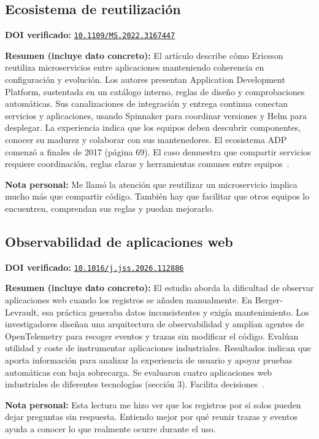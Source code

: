 \documentclass[12pt,a4paper]{article}
\begin{document}
\subsection{Ecosistema de reutilización}
\noindent\textbf{DOI verificado:} \href{https://doi.org/10.1109/MS.2022.3167447}{\nolinkurl{10.1109/MS.2022.3167447}}\par
\noindent\textbf{Resumen (incluye dato concreto):} El artículo describe cómo Ericsson reutiliza microservicios entre aplicaciones manteniendo coherencia en configuración y evolución. Los autores presentan Application Development Platform, sustentada en un catálogo interno, reglas de diseño y comprobaciones automáticas. Sus canalizaciones de integración y entrega continua conectan servicios y aplicaciones, usando Spinnaker para coordinar versiones y Helm para desplegar. La experiencia indica que los equipos deben descubrir componentes, conocer su madurez y colaborar con sus mantenedores. El ecosistema ADP comenzó a finales de 2017 (página 69). El caso demuestra que compartir servicios requiere coordinación, reglas claras y herramientas comunes entre equipos~\cite{UsMuhBadDeepSmiChrisNayHiman2022}.\par
\noindent\textbf{Nota personal:} Me llamó la atención que reutilizar un microservicio implica mucho más que compartir código. También hay que facilitar que otros equipos lo encuentren, comprendan sus reglas y puedan mejorarlo.\par

\subsection{Observabilidad de aplicaciones web}
\noindent\textbf{DOI verificado:} \href{https://doi.org/10.1016/j.jss.2026.112886}{\nolinkurl{10.1016/j.jss.2026.112886}}\par
\noindent\textbf{Resumen (incluye dato concreto):} El estudio aborda la dificultad de observar aplicaciones web cuando los registros se añaden manualmente. En Berger-Levrault, esa práctica generaba datos inconsistentes y exigía mantenimiento. Los investigadores diseñan una arquitectura de observabilidad y amplían agentes de OpenTelemetry para recoger eventos y trazas sin modificar el código. Evalúan utilidad y coste de instrumentar aplicaciones industriales. Resultados indican que aporta información para analizar la experiencia de usuario y apoyar pruebas automáticas con baja sobrecarga. Se evaluaron cuatro aplicaciones web industriales de diferentes tecnologías (sección 3). Facilita decisiones~\cite{ShatnawiRimaAlsharaDarbordSeriaiBortolaso2026}.\par
\noindent\textbf{Nota personal:} Esta lectura me hizo ver que los registros por sí solos pueden dejar preguntas sin respuesta. Entiendo mejor por qué reunir trazas y eventos ayuda a conocer lo que realmente ocurre durante el uso.\par
\end{document}
